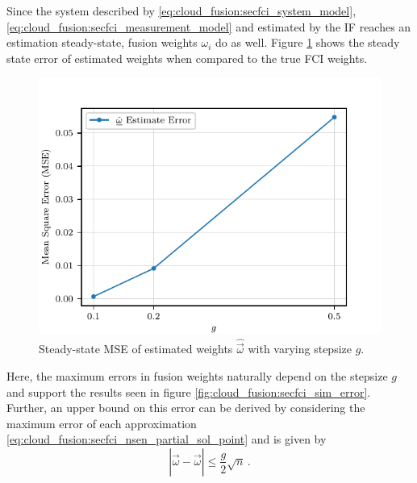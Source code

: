Since the system described by \eqref{eq:cloud_fusion:secfci_system_model}, \eqref{eq:cloud_fusion:secfci_measurement_model} and estimated by the IF reaches an estimation steady-state, fusion weights $\omega_i$ do as well. Figure \ref{fig:cloud_fusion:secfci_omega_error} shows the steady state error of estimated weights when compared to the true FCI weights. 
\begin{figure}[htbp]
    \centering
    \includegraphics{figures/cloud_fusion_secfci_omega_error.pdf}
    \caption{Steady-state MSE of estimated weights $\hat{\vec{\omega}}$ with varying stepsize $g$.}
    \label{fig:cloud_fusion:secfci_omega_error}
\end{figure}
Here, the maximum errors in fusion weights naturally depend on the stepsize $g$ and support the results seen in figure \ref{fig:cloud_fusion:secfci_sim_error}. Further, an upper bound on this error can be derived by considering the maximum error of each approximation \eqref{eq:cloud_fusion:secfci_nsen_partial_sol_point} and is given by
\begin{equation}
    \left|\hat{\vec{\omega}} - \vec{\omega}\right| \leq \frac{g}{2}\sqrt{n}\,.
\end{equation}

% 
%                                                                                           
%                                                                                           
%                                                                                           
% 

